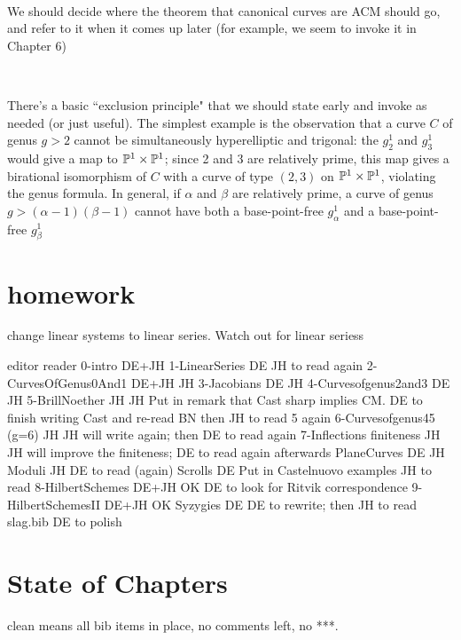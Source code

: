 \documentclass[12pt, leqno]{book}
\begin{document}
\

We should decide where the theorem that canonical curves are ACM should go, and refer to it when it comes up later (for example, we seem to invoke it in Chapter 6)

\

There's a basic ``exclusion principle" that we should state early and invoke as needed (or just useful). The simplest example is the observation that a curve $C$ of genus $g > 2$ cannot be simultaneously hyperelliptic and trigonal: the $g^1_2$ and $g^1_3$ would give a map to $\PP^1 \times \PP^1$; since 2 and 3 are relatively prime, this map gives a birational isomorphism of $C$ with a curve of type $(2,3)$ on $\PP^1 \times \PP^1$, violating the genus formula. In general, if $\alpha$ and $\beta$ are relatively prime, a curve of genus $g > (\alpha - 1)(\beta - 1)$ cannot have both a base-point-free $g^1_\alpha$ and a base-point-free $g^1_\beta$

\section{homework}

change linear systems to linear series. Watch out for linear seriess

						editor	reader
{0-intro}					DE+JH	
{1-LinearSeries} 					DE JH to read again
{2-CurvesOfGenus0And1}		DE+JH	JH		
{3-Jacobians}				DE		JH
{4-Curvesofgenus2and3}		DE		JH
{5-BrillNoether}				JH		JH  Put in remark that Cast sharp implies CM. DE to finish writing Cast and re-read BN then JH to read 5 again
{6-Curvesofgenus45}		(g=6)	JH JH will write again; then DE to read again
{7-Inflections} 				finiteness	JH JH will improve the finiteness; DE to read again afterwards
{PlaneCurves}				DE		JH
{Moduli}							JH  DE to read (again)
{Scrolls}							DE Put in Castelnuovo examples JH to read
{8-HilbertSchemes}			DE+JH		OK  DE to look for Ritvik correspondence
{9-HilbertSchemesII}			DE+JH		OK
{Syzygies}					DE			DE to rewrite; then JH to read
slag.bib								DE to polish



\section{State of Chapters}
clean means all bib items in place, no \fix comments left, no ***.
\end{document}

